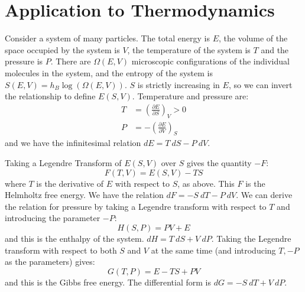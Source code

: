 \documentclass[../Main.tex]{subfiles}
\begin{document}
\section{Application to Thermodynamics}
Consider a system of many particles. The total energy is $E$, the volume of the space occupied by the system is $V$, the temperature of the system is $T$ and the pressure is $P$. There are $\Omega(E, V)$ microscopic configurations of the individual molecules in the system, and the entropy of the system is $S(E, V) = h_B \log(\Omega(E, V))$. $S$ is strictly increasing in $E$, so we can invert the relationship to define $E(S, V)$.
Temperature and pressure are:
\begin{align*}
    T &= \left(\frac{\partial E}{\partial S}\right)_V > 0 \\
    P &= -\left(\frac{\partial E}{\partial V}\right)_S
\end{align*}
and we have the infinitesimal relation $dE = T~dS - P~dV$.

Taking a Legendre Transform of $E(S, V)$ over $S$ gives the quantity $-F$:
\begin{equation*}
    F(T, V) = E(S, V) - TS
\end{equation*}
where $T$ is the derivative of $E$ with respect to $S$, as above. This $F$ is the Helmholtz free energy. We have the relation $dF = -S~dT - P~dV$. We can derive the relation for pressure by taking a Legendre transform with respect to $T$ and introducing the parameter $-P$:
\begin{equation*}
    H(S, P) = PV + E
\end{equation*}
and this is the enthalpy of the system. $dH = T~dS + V~dP$. Taking the Legendre transform with respect to both $S$ and $V$ at the same time (and introducing $T, -P$ as the parameters) gives:
\begin{equation*}
    G(T, P) = E - TS + PV
\end{equation*}
and this is the Gibbs free energy. The differential form is $dG = -S~dT + V~dP$.
\end{document}
